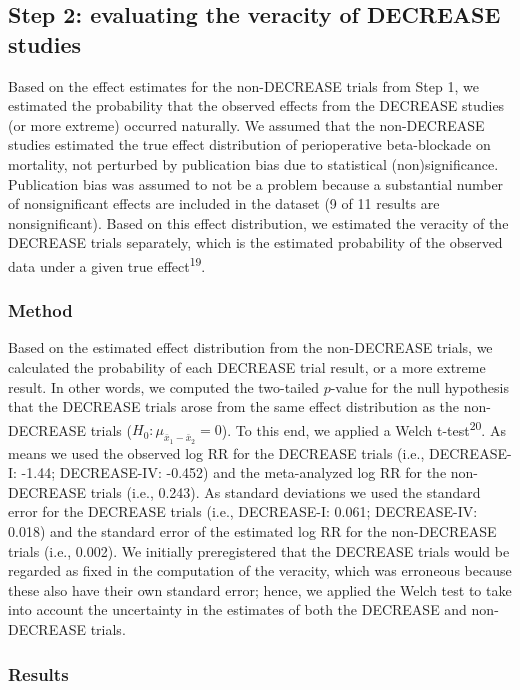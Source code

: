 \documentclass[]{article}
\begin{document}
\subsection{Step 2: evaluating the veracity of DECREASE
studies}\label{step-2-evaluating-the-veracity-of-decrease-studies}

Based on the effect estimates for the non-DECREASE trials from Step 1,
we estimated the probability that the observed effects from the DECREASE
studies (or more extreme) occurred naturally. We assumed that the
non-DECREASE studies estimated the true effect distribution of
perioperative beta-blockade on mortality, not perturbed by publication
bias due to statistical (non)significance. Publication bias was assumed
to not be a problem because a substantial number of nonsignificant
effects are included in the dataset (9 of 11 results are
nonsignificant). Based on this effect distribution, we estimated the
veracity of the DECREASE trials separately, which is the estimated
probability of the observed data under a given true
effect\textsuperscript{19}.

\subsubsection{Method}\label{method}

Based on the estimated effect distribution from the non-DECREASE trials,
we calculated the probability of each DECREASE trial result, or a more
extreme result. In other words, we computed the two-tailed \(p\)-value
for the null hypothesis that the DECREASE trials arose from the same
effect distribution as the non-DECREASE trials
(\(H_0:\mu_{\bar{x}_1-\bar{x}_2}=0\)). To this end, we applied a Welch
t-test\textsuperscript{20}. As means we used the observed log RR for the
DECREASE trials (i.e., DECREASE-I: -1.44; DECREASE-IV: -0.452) and the
meta-analyzed log RR for the non-DECREASE trials (i.e., 0.243). As
standard deviations we used the standard error for the DECREASE trials
(i.e., DECREASE-I: 0.061; DECREASE-IV: 0.018) and the standard error of
the estimated log RR for the non-DECREASE trials (i.e., 0.002). We
initially preregistered that the DECREASE trials would be regarded as
fixed in the computation of the veracity, which was erroneous because
these also have their own standard error; hence, we applied the Welch
test to take into account the uncertainty in the estimates of both the
DECREASE and non-DECREASE trials.

\subsubsection{Results}\label{results-1}
\end{document}
